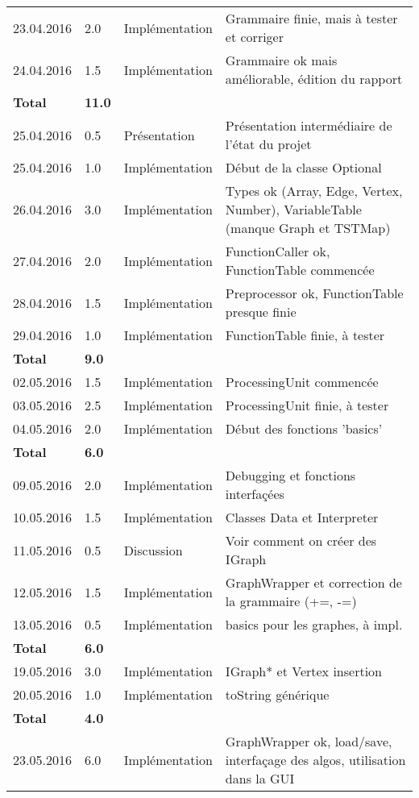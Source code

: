 \documentclass[french]{article}
\begin{document}
\begin{longtable}{p{}|p{}|p{}|p{}}
		23.04.2016 & 2.0 & Implémentation & Grammaire finie, mais à tester et corriger\\
		24.04.2016 & 1.5 & Implémentation & Grammaire ok mais améliorable, édition du rapport\\   
		\textbf{Total} & \textbf{11.0} &&\\
		\hline
		25.04.2016 & 0.5 & Présentation & Présentation intermédiaire de l'état du projet\\
		25.04.2016 & 1.0 & Implémentation & Début de la classe Optional\\
		26.04.2016 & 3.0 & Implémentation & Types ok (Array, Edge, Vertex, Number), VariableTable (manque Graph et TSTMap)\\
		27.04.2016 & 2.0 & Implémentation & FunctionCaller ok, FunctionTable commencée\\
		28.04.2016 & 1.5 & Implémentation & Preprocessor ok, FunctionTable presque finie\\
		29.04.2016 & 1.0 & Implémentation & FunctionTable finie, à tester\\  
		\textbf{Total} & \textbf{9.0} &&\\
		\hline
		02.05.2016 & 1.5 & Implémentation & ProcessingUnit commencée\\
		03.05.2016 & 2.5 & Implémentation & ProcessingUnit finie, à tester\\
		04.05.2016 & 2.0 & Implémentation & Début des fonctions 'basics'\\  
		\textbf{Total} & \textbf{6.0} &&\\
		\hline 
		09.05.2016 & 2.0 & Implémentation & Debugging et fonctions interfaçées\\
		10.05.2016 & 1.5 & Implémentation & Classes Data et Interpreter\\
		11.05.2016 & 0.5 & Discussion & Voir comment on créer des IGraph\\
		12.05.2016 & 1.5 & Implémentation & GraphWrapper et correction de la grammaire (+=, -=)\\
		13.05.2016 & 0.5 & Implémentation & basics pour les graphes, à impl.\\  
		\textbf{Total} & \textbf{6.0} &&\\
		\hline
		19.05.2016 & 3.0 & Implémentation & IGraph* et Vertex insertion\\
		20.05.2016 & 1.0 & Implémentation & toString générique\\  
		\textbf{Total} & \textbf{4.0} &&\\
		\hline
		23.05.2016 & 6.0 & Implémentation & GraphWrapper ok, load/save, interfaçage des algos, utilisation dans la GUI\\

\end{longtable}
\end{document}
